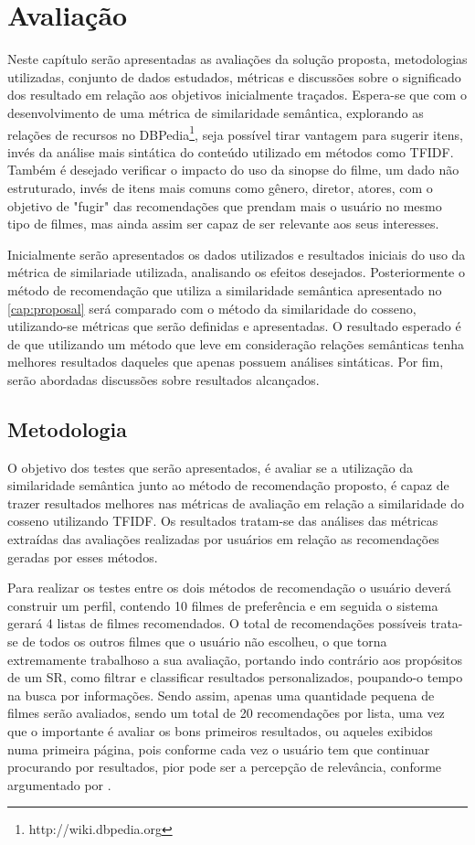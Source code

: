 \chapter{Avaliação}

Neste capítulo serão apresentadas as avaliações da solução proposta, metodologias utilizadas,  conjunto de dados estudados, métricas e discussões sobre o significado dos resultado em relação aos objetivos inicialmente traçados. Espera-se que com o desenvolvimento de uma métrica de similaridade semântica, explorando as relações de recursos no DBPedia\footnote{http://wiki.dbpedia.org}, seja possível tirar vantagem para sugerir itens, invés da análise mais sintática do conteúdo utilizado em métodos como \ac{TFIDF}. Também é desejado verificar o impacto do uso da sinopse do filme, um dado não estruturado, invés de itens mais comuns como gênero, diretor, atores, com o objetivo de "fugir" das recomendações que prendam mais o usuário no mesmo tipo de filmes, mas ainda assim ser capaz de ser relevante aos seus interesses.

Inicialmente serão apresentados os dados utilizados e resultados iniciais do uso da métrica de similariade utilizada, analisando os efeitos desejados. Posteriormente o método de recomendação que utiliza a similaridade semântica apresentado no \ref{cap:proposal} será comparado com o método da similaridade do cosseno, utilizando-se métricas que serão definidas e apresentadas. O resultado esperado é de que utilizando um método que leve em consideração relações semânticas tenha melhores resultados daqueles que apenas possuem análises sintáticas. Por fim, serão abordadas discussões sobre resultados alcançados.

\section{Metodologia}

O objetivo dos testes que serão apresentados, é avaliar se a utilização da similaridade semântica junto ao método de recomendação proposto, é capaz de trazer resultados melhores nas métricas de avaliação em relação a similaridade do cosseno utilizando \ac{TFIDF}.  Os resultados tratam-se das análises das métricas extraídas das avaliações realizadas por usuários em relação as recomendações geradas por esses métodos.

Para realizar os testes entre os dois métodos de recomendação o usuário deverá construir um perfil, contendo 10 filmes de preferência e em seguida o sistema gerará 4 listas de filmes recomendados. O total de recomendações possíveis trata-se de todos os outros filmes que o usuário não escolheu, o que torna extremamente trabalhoso a sua avaliação, portando indo contrário aos propósitos de um \ac{SR}, como filtrar e classificar resultados personalizados, poupando-o tempo na busca por informações. Sendo assim, apenas uma quantidade pequena de filmes serão avaliados, sendo um total de 20 recomendações por lista, uma vez que o importante é avaliar os bons primeiros resultados, ou aqueles exibidos numa primeira página, pois conforme cada vez o usuário tem que continuar procurando por resultados, pior pode ser a percepção de relevância, conforme argumentado por \cite{Manning:2008}. 

